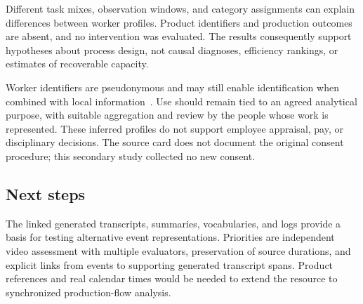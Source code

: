 Different task mixes, observation windows, and category assignments can explain differences between worker profiles. Product identifiers and production outcomes are absent, and no intervention was evaluated. The results consequently support hypotheses about process design, not causal diagnoses, efficiency rankings, or estimates of recoverable capacity.

\label{sec:ethics}
Worker identifiers are pseudonymous and may still enable identification when combined with local information~\cite{mannhardt2018privacy}. Use should remain tied to an agreed analytical purpose, with suitable aggregation and review by the people whose work is represented. These inferred profiles do not support employee appraisal, pay, or disciplinary decisions. The source card does not document the original consent procedure; this secondary study collected no new consent.

\subsection{Next steps}
The linked generated transcripts, summaries, vocabularies, and logs provide a basis for testing alternative event representations. Priorities are independent video assessment with multiple evaluators, preservation of source durations, and explicit links from events to supporting generated transcript spans. Product references and real calendar times would be needed to extend the resource to synchronized production-flow analysis.
